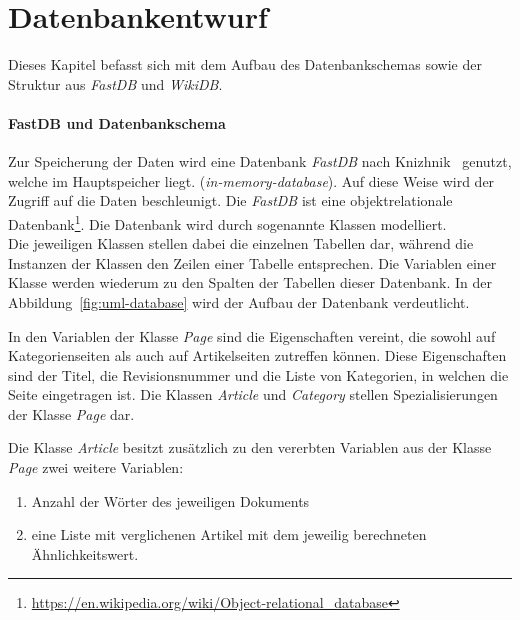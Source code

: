 


\section{Datenbankentwurf}
\label{subchap:database}
Dieses Kapitel befasst sich mit dem Aufbau des Datenbankschemas sowie der Struktur aus \emph{FastDB} und \emph{WikiDB}.

\paragraph{FastDB und Datenbankschema}
Zur Speicherung der Daten wird eine Datenbank \emph{FastDB} nach Knizhnik~\cite{fastdb} genutzt, welche im Hauptspeicher liegt. (\emph{in-memory-database}).
Auf diese Weise wird der Zugriff auf die Daten beschleunigt.
Die \emph{FastDB} ist eine objektrelationale Datenbank\footnote{\url{https://en.wikipedia.org/wiki/Object-relational\_database}}.
Die Datenbank wird durch sogenannte Klassen modelliert.\\
Die jeweiligen Klassen stellen dabei die einzelnen Tabellen dar, während die Instanzen der Klassen den Zeilen einer Tabelle entsprechen.
Die Variablen einer Klasse werden wiederum zu den Spalten der Tabellen dieser Datenbank.
In der Abbildung~\ref{fig:uml-database} wird der Aufbau der Datenbank verdeutlicht.

In den Variablen der Klasse \emph{Page} sind die Eigenschaften vereint, die sowohl auf Kategorienseiten als auch auf Artikelseiten zutreffen können.
Diese Eigenschaften sind der Titel, die Revisionsnummer und die Liste von Kategorien, in welchen die Seite eingetragen ist.
Die Klassen \emph{Article} und \emph{Category} stellen Spezialisierungen der Klasse \emph{Page} dar.

Die Klasse \emph{Article} besitzt zusätzlich zu den vererbten Variablen aus der Klasse \emph{Page} zwei weitere Variablen:
\begin{enumerate}[label*=(\arabic*),leftmargin=1.5cm,series=example]
\item{Anzahl der Wörter des jeweiligen Dokuments}
\item{eine Liste mit verglichenen Artikel mit dem jeweilig berechneten Ähnlichkeitswert.}
\end{enumerate}

